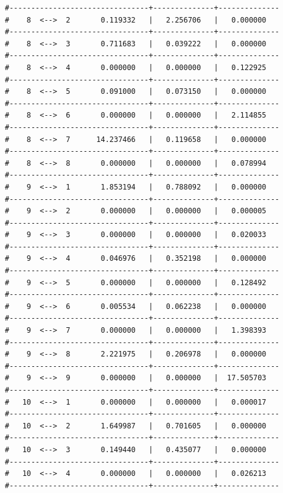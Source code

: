 \begin{enumerate}
{\begin{verbatim}
#--------------------------------+--------------+--------------
#    8  <-->  2       0.119332   |   2.256706   |   0.000000   
#--------------------------------+--------------+--------------
#    8  <-->  3       0.711683   |   0.039222   |   0.000000   
#--------------------------------+--------------+--------------
#    8  <-->  4       0.000000   |   0.000000   |   0.122925   
#--------------------------------+--------------+--------------
#    8  <-->  5       0.091000   |   0.073150   |   0.000000   
#--------------------------------+--------------+--------------
#    8  <-->  6       0.000000   |   0.000000   |   2.114855   
#--------------------------------+--------------+--------------
#    8  <-->  7      14.237466   |   0.119658   |   0.000000   
#--------------------------------+--------------+--------------
#    8  <-->  8       0.000000   |   0.000000   |   0.078994   
#--------------------------------+--------------+--------------
#    9  <-->  1       1.853194   |   0.788092   |   0.000000   
#--------------------------------+--------------+--------------
#    9  <-->  2       0.000000   |   0.000000   |   0.000005   
#--------------------------------+--------------+--------------
#    9  <-->  3       0.000000   |   0.000000   |   0.020033   
#--------------------------------+--------------+--------------
#    9  <-->  4       0.046976   |   0.352198   |   0.000000   
#--------------------------------+--------------+--------------
#    9  <-->  5       0.000000   |   0.000000   |   0.128492   
#--------------------------------+--------------+--------------
#    9  <-->  6       0.005534   |   0.062238   |   0.000000   
#--------------------------------+--------------+--------------
#    9  <-->  7       0.000000   |   0.000000   |   1.398393   
#--------------------------------+--------------+--------------
#    9  <-->  8       2.221975   |   0.206978   |   0.000000   
#--------------------------------+--------------+--------------
#    9  <-->  9       0.000000   |   0.000000   |  17.505703   
#--------------------------------+--------------+--------------
#   10  <-->  1       0.000000   |   0.000000   |   0.000017   
#--------------------------------+--------------+--------------
#   10  <-->  2       1.649987   |   0.701605   |   0.000000   
#--------------------------------+--------------+--------------
#   10  <-->  3       0.149440   |   0.435077   |   0.000000   
#--------------------------------+--------------+--------------
#   10  <-->  4       0.000000   |   0.000000   |   0.026213   
#--------------------------------+--------------+--------------

\end{verbatim}}
\end{enumerate}
